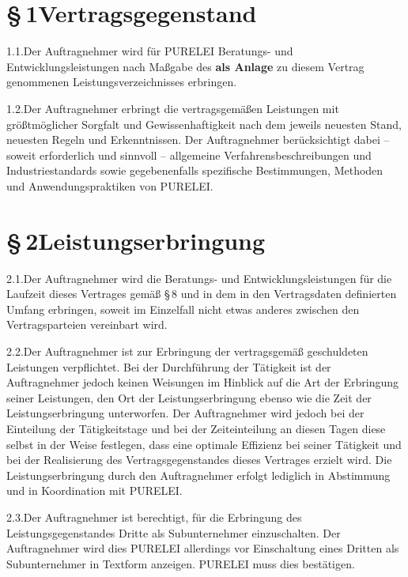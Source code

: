 \documentclass[11pt,a4paper]{article}
\newcommand{\ClientKurzname}{PURELEI}
\begin{document}
\section{§\,1\quad Vertragsgegenstand}

1.1.\quad Der Auftragnehmer wird für \ClientKurzname{} Beratungs- und Entwicklungsleistungen nach Maßgabe des \textbf{als Anlage} zu diesem Vertrag genommenen Leistungsverzeichnisses erbringen.

1.2.\quad Der Auftragnehmer erbringt die vertragsgemäßen Leistungen mit größtmöglicher Sorgfalt und Gewissenhaftigkeit nach dem jeweils neuesten Stand, neuesten Regeln und Erkenntnissen. Der Auftragnehmer berücksichtigt dabei – soweit erforderlich und sinnvoll – allgemeine Verfahrensbeschreibungen und Industriestandards sowie gegebenenfalls spezifische Bestimmungen, Methoden und Anwendungspraktiken von \ClientKurzname.

\section{§\,2\quad Leistungserbringung}

2.1.\quad Der Auftragnehmer wird die Beratungs- und Entwicklungsleistungen für die Laufzeit dieses Vertrages gemäß §\,8 und in dem in den Vertragsdaten definierten Umfang erbringen, soweit im Einzelfall nicht etwas anderes zwischen den Vertragsparteien vereinbart wird.

2.2.\quad Der Auftragnehmer ist zur Erbringung der vertragsgemäß geschuldeten Leistungen verpflichtet. Bei der Durchführung der Tätigkeit ist der Auftragnehmer jedoch keinen Weisungen im Hinblick auf die Art der Erbringung seiner Leistungen, den Ort der Leistungserbringung ebenso wie die Zeit der Leistungserbringung unterworfen. Der Auftragnehmer wird jedoch bei der Einteilung der Tätigkeitstage und bei der Zeiteinteilung an diesen Tagen diese selbst in der Weise festlegen, dass eine optimale Effizienz bei seiner Tätigkeit und bei der Realisierung des Vertragsgegenstandes dieses Vertrages erzielt wird. Die Leistungserbringung durch den Auftragnehmer erfolgt lediglich in Abstimmung und in Koordination mit \ClientKurzname.

2.3.\quad Der Auftragnehmer ist berechtigt, für die Erbringung des Leistungsgegenstandes Dritte als Subunternehmer einzuschalten. Der Auftragnehmer wird dies \ClientKurzname{} allerdings vor Einschaltung eines Dritten als Subunternehmer in Textform anzeigen. \ClientKurzname{} muss dies bestätigen.
\end{document}
